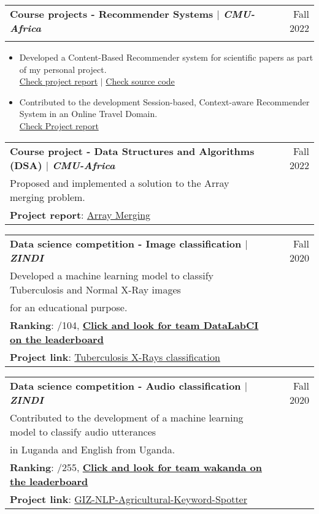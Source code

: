 \documentclass[A4,11pt]{article}
\makeatletter
\newcommand{\CVItem}[1]{
  \item\small{
    {#1 \vspace{-2pt}}
  }
}
\newcommand{\CVSubheading}[4]{
  \vspace{-2pt}\item
    \begin{tabular*}{0.97\textwidth}[t]{l@{\extracolsep{\fill}}r}
      \textbf{#1} & #2 \\
      \small#3 & \small #4 \\
    \end{tabular*}\vspace{-7pt}
}
\newcommand{\CVItemListStart}{\begin{itemize}}
\newcommand{\CVItemListEnd}{\end{itemize}\vspace{-5pt}}
\makeatother
\begin{document}
\CVSubheading
{{Course projects - Recommender Systems} $|$ \emph{\small{CMU-Africa}}}{Fall 2022}
{}{}
\CVItemListStart
\CVItem{Developed a Content-Based Recommender system for scientific papers as part of my personal project.\\
\href{https://drive.google.com/file/d/1uGFDoeo8A1XUb8rJloArxej1mTn1gIpW/view?usp=drive_link}{Check project report} $|$ \href{https://github.com/dric2018/ScietificPaperCBRS}{Check source code}
}
\CVItem{Contributed to the development Session-based, Context-aware Recommender System in an Online Travel Domain.\\
  \href{https://drive.google.com/file/d/14eQnujFpAeI2UUcF1mfISOEqsW1OuqCi/view?usp=drive_link}{Check Project report}
}
\CVItemListEnd

\CVSubheading
{{Course project - Data Structures and Algorithms (DSA)} $|$ \emph{\small{CMU-Africa}}}{Fall 2022}
{Proposed and implemented a solution to the Array merging problem.\\
  \textbf{Project report}: \href{https://drive.google.com/file/d/1zgVpXr20PhzYbI6qBsgSx-KKEhkL9Oso/view?usp=drive_link}{Array Merging}
}{}

\CVSubheading
{{Data science competition - Image classification} $|$ \emph{\small{ZINDI}}}{Fall 2020}
{Developed a machine learning model to classify Tuberculosis and Normal X-Ray images \\
  for an educational purpose. \\
  \textbf{Ranking}: \nth{7}/104, \textbf{\href{https://zindi.africa/competitions/runmila-ai-institute-minohealth-ai-labs-tuberculosis-classification-via-x-rays-challenge/leaderboard}{Click and look for team DataLabCI on the leaderboard}} \\
  \textbf{Project link}: \href{https://github.com/dric2018/ZindiTuberculosisClassification}{Tuberculosis X-Rays classification}
}{}

\CVSubheading
{{Data science competition - Audio classification} $|$ \emph{\small{ZINDI}}}{Fall 2020}
{Contributed to the development of a machine learning model to classify audio utterances \\
  in Luganda and English from Uganda. \\
  \textbf{Ranking}: \nth{7}/255, \textbf{\href{https://zindi.africa/competitions/giz-nlp-agricultural-keyword-spotter/leaderboard}{Click and look for team wakanda on the leaderboard}} \\
  \textbf{Project link}: \href{https://github.com/NazarioR9/GIZ-NLP-Agricultural-Keyword-Spotter}{GIZ-NLP-Agricultural-Keyword-Spotter}
}{}
\end{document}
